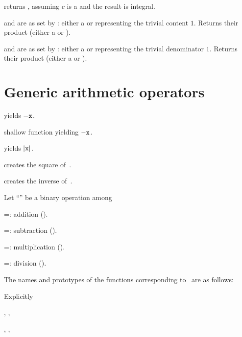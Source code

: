  returns , assuming $c$
is a  and the result is integral.

   and  are
as set by : either a  or 
representing the trivial content $1$. Returns their product (either a
 or ).

  and  are
as set by : either a  or  representing
the trivial denominator $1$. Returns their product (either a  or
).

\section{Generic arithmetic operators}


 yields $-{\tt x}$.

 shallow function yielding $-{\tt x}$.

 yields $|{\tt x}|$.

 creates the square of~.

 creates the inverse of~.


Let ``\op'' be a binary operation among

\op=: addition ().

\op=: subtraction ().

\op=: multiplication ().

\op=: division ().

\noindent The names and prototypes of the functions corresponding
to \op\ are as follows:




\noindent Explicitly

, ,

, ,

